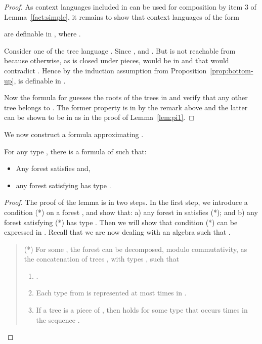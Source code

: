 \documentclass{LMCS}
\begin{document}
{\begin{proof}
 As context
  languages included in  can be used for composition by item 3 of
  Lemma~\ref{fact:simple}, it remains to show that context languages of the form
  
 are
  definable in \Stwo, where .


  Consider one of the tree language . Since ,  and . But  is not reachable from  because
  otherwise, as  is closed under pieces,  would be in
   and that would contradict . Hence by the induction
  assumption from Proposition~\ref{prop:bottom-up},  is definable in
  \Stwo.

  Now the \Stwo formula for  guesses the roots of the trees in  and verify that any other tree belongs to  . The former property is in \Stwo by the remark above and the
  latter can be shown to be in  as in the proof of Lemma~\ref{lem:pi1}.
\end{proof}

We now construct a \Stwo formula approximating .

\begin{lem}\label{lemma:sigma2-forest}
  For any type , there is a formula   of 
  \Stwo such that:
\begin{itemize}
  \item Any forest   satisfies  and,
\item any forest satisfying  has type .
\end{itemize}
\end{lem}
\vspace{-.2cm}
\begin{proof}
  The proof of the lemma is in two steps.  In the first step, we
introduce a condition (*) on a forest , and show that: a) any
forest in  satisfies (*); and b) any forest satisfying (*) has
type . Then we will show that condition (*) can be expressed in
\Stwo. Recall that we are now dealing with an algebra such that .


 \begin{quote}
(*) For some , the forest  can be decomposed, modulo
    commutativity, as the concatenation  of trees
    , with types , such that
  \begin{enumerate}
\item .
\item Each type from  is represented at most  times in
.
  \item If a tree  is a piece of , then
     holds for some type  that occurs
     times in the sequence .
  \end{enumerate}
  \end{quote}


\end{proof}}
\end{document}
